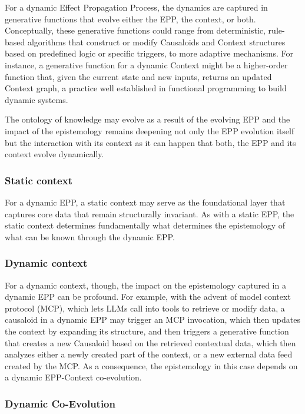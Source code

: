 \documentclass{article}
\begin{document}
For a dynamic Effect Propagation Process, the dynamics are captured in generative functions that evolve either the EPP, the context, or both. Conceptually, these generative functions could range from deterministic, rule-based algorithms that construct or modify Causaloids and Context structures based on predefined logic or specific triggers, to more adaptive mechanisms. For instance, a generative function for a dynamic Context might be a higher-order function that, given the current state and new inputs, returns an updated Context graph, a practice well established in functional programming to build dynamic systems.

The ontology of knowledge may evolve as a result of the evolving EPP and the impact of the epistemology remains deepening not only the EPP evolution itself but the interaction with its context as it can happen that both, the EPP and its context evolve dynamically.

\subsubsection{Static context}

For a dynamic EPP, a static context may serve as the foundational layer that captures core data that remain structurally invariant. As with a static EPP, the static context determines fundamentally what determines the epistemology of what can be known through the dynamic EPP.

\newpage

\subsubsection{Dynamic context}

For a dynamic context, though, the impact on the epistemology captured in a dynamic EPP can be profound. For example, with the advent of model context protocol (MCP), which lets LLMs call into tools to retrieve or modify data, a causaloid in a dynamic EPP may trigger an MCP invocation, which then updates the context by expanding its structure, and then triggers a generative function that creates a new Causaloid based on the retrieved contextual data, which then analyzes either a newly created part of the context, or a new external data feed created by the MCP. As a consequence, the epistemology in this case depends on a dynamic EPP-Context co-evolution.


\subsubsection{Dynamic Co-Evolution}
\end{document}
